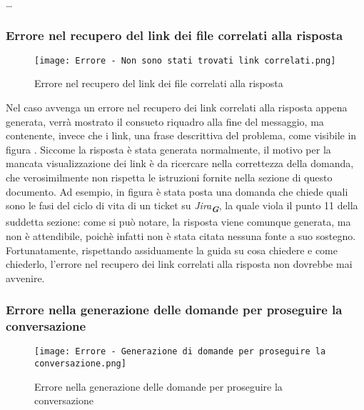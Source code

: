 \dots


\subsubsection{Errore nel recupero del link dei file correlati alla risposta}

\begin{figure}[h]
    \centering
        \texttt{[image: Errore - Non sono stati trovati link correlati.png]}
        \caption{Errore nel recupero del link dei file correlati alla risposta}
        \label{fig:Errore nel recupero del link dei file correlati alla risposta}
\end{figure}

Nel caso avvenga un errore nel recupero dei link correlati alla risposta appena generata, verrà mostrato il consueto riquadro alla fine del messaggio, ma contenente, invece che i link, una frase descrittiva del problema, come visibile in figura . Siccome la risposta è stata generata normalmente, il motivo per la mancata visualizzazione dei link è da ricercare nella correttezza della domanda, che verosimilmente non rispetta le istruzioni fornite nella sezione  di questo documento. Ad esempio, in figura è stata posta una domanda che chiede quali sono le fasi del ciclo di vita di un ticket su \emph{Jira}\textsubscript{\textbf{\textit{G}}}, la quale viola il punto 11 della suddetta sezione: come si può notare, la risposta viene comunque generata, ma non è attendibile, poichè infatti non è stata citata nessuna fonte a suo sostegno. Fortunatamente, rispettando assiduamente la guida su cosa chiedere e come chiederlo, l'errore nel recupero dei link correlati alla risposta non dovrebbe mai avvenire.


\subsubsection{Errore nella generazione delle domande per proseguire la conversazione}

\begin{figure}[h]
    \centering
        \texttt{[image: Errore - Generazione di domande per proseguire la conversazione.png]}
        \caption{Errore nella generazione delle domande per proseguire la conversazione}
        \label{fig:Errore nella generazione delle domande per proseguire la conversazione}
\end{figure}

